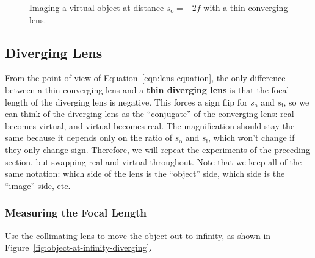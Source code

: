 \documentclass[]{manual}
\begin{document}
    \begin{figure}
        \centering


        \caption{
            Imaging a virtual object at distance $s_{\mathrm{o}} = -2f$ with a thin converging lens.
        }

        \label{fig:-2f}
    \end{figure}

    \subsection{Diverging Lens}

    From the point of view of Equation~\eqref{eqn:lens-equation}, the only difference between a thin converging lens and a \textbf{thin diverging lens} is that the focal length of the diverging lens is negative.
    This forces a sign flip for $s_{\mathrm{o}}$ and $s_{\mathrm{i}}$, so we can think of the diverging lens as the ``conjugate'' of the converging lens: real becomes virtual, and virtual becomes real.
    The magnification should stay the same because it depends only on the ratio of $s_{\mathrm{o}}$ and $s_{\mathrm{i}}$, which won't change if they only change sign.
    Therefore, we will repeat the experiments of the preceding section, but swapping real and virtual throughout.
    Note that we keep all of the same notation: which side of the lens is the ``object'' side, which side is the ``image'' side, etc.

    \subsubsection{Measuring the Focal Length}

    Use the collimating lens to move the object out to infinity, as shown in Figure~\ref{fig:object-at-infinity-diverging}.
\end{document}
